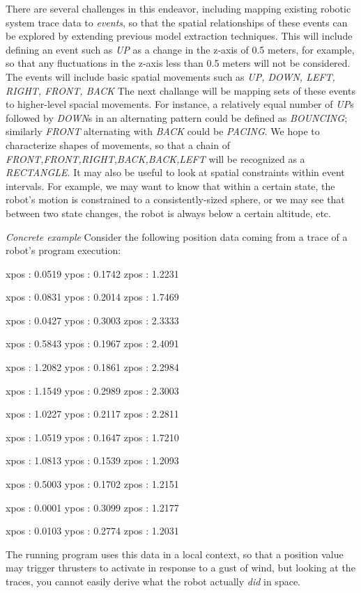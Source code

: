 There are several challenges in this endeavor, including mapping existing robotic system trace data to \emph{events}, so that the spatial relationships of these events can be explored by extending previous model extraction techniques. 
This will include defining an event such as \emph{UP} as a change in the z-axis of 0.5 meters, for example, so that any fluctuations in the z-axis less than 0.5 meters will not be considered.  
The events will include basic spatial movements such as \emph{UP, DOWN, LEFT, RIGHT, FRONT, BACK} 
The next challange will be mapping sets of these events to higher-level spacial movements.  
For instance, a relatively equal number of \emph{UP}s followed by \emph{DOWN}s in an alternating pattern could be defined as \emph{BOUNCING}; similarly \emph{FRONT} alternating with \emph{BACK} could be \emph{PACING}.
We hope to characterize shapes of movements, so that a chain of \emph{FRONT,FRONT,RIGHT,BACK,BACK,LEFT} will be recognized as a \emph{RECTANGLE}.
It may also be useful to look at spatial constraints within event intervals.  
For example, we may want to know that within a certain state, the robot's motion is constrained to a consistently-sized sphere, or we may see that between two state changes, the robot is always below a certain altitude, etc.

\emph{Concrete example}
Consider the following position data coming from a trace of a robot's program execution:


xpos : 0.0519  ypos : 0.1742  zpos : 1.2231

xpos : 0.0831  ypos : 0.2014  zpos : 1.7469

xpos : 0.0427  ypos : 0.3003  zpos : 2.3333

xpos : 0.5843  ypos : 0.1967  zpos : 2.4091

xpos : 1.2082  ypos : 0.1861  zpos : 2.2984

xpos : 1.1549  ypos : 0.2989  zpos : 2.3003

xpos : 1.0227  ypos : 0.2117  zpos : 2.2811

xpos : 1.0519  ypos : 0.1647  zpos : 1.7210

xpos : 1.0813  ypos : 0.1539  zpos : 1.2093

xpos : 0.5003  ypos : 0.1702  zpos : 1.2151

xpos : 0.0001  ypos : 0.3099  zpos : 1.2177

xpos : 0.0103  ypos : 0.2774  zpos : 1.2031

The running program uses this data in a local context, so that a position value may trigger thrusters to activate in response to a gust of wind, but looking at the traces, you cannot easily derive what the robot actually \emph{did} in space.

